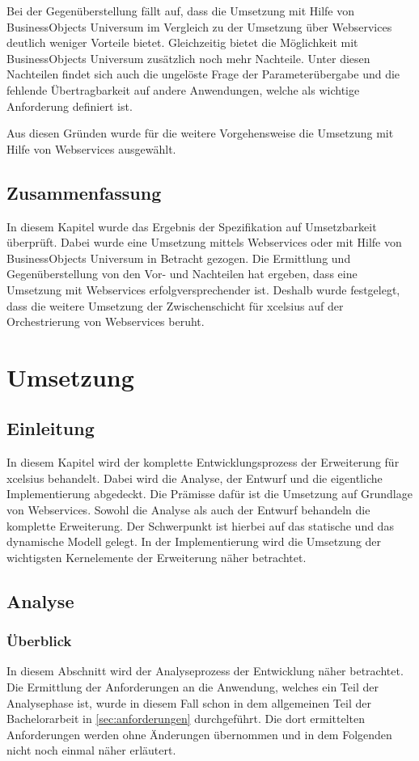 \begin{onehalfspacing}
Bei der Gegenüberstellung fällt auf, dass die Umsetzung mit Hilfe von BusinessObjects Universum im Vergleich zu der Umsetzung über Webservices deutlich weniger Vorteile bietet. Gleichzeitig bietet die Möglichkeit mit BusinessObjects Universum zusätzlich noch mehr Nachteile. Unter diesen Nachteilen findet sich auch die ungelöste Frage der Parameterübergabe und die fehlende Übertragbarkeit auf andere Anwendungen, welche als wichtige Anforderung definiert ist.

Aus diesen Gründen wurde für die weitere Vorgehensweise die Umsetzung mit Hilfe von Webservices ausgewählt.

\section{Zusammenfassung}
In diesem Kapitel wurde das Ergebnis der Spezifikation auf Umsetzbarkeit überprüft. Dabei wurde eine Umsetzung mittels Webservices oder mit Hilfe von BusinessObjects Universum in Betracht gezogen. Die Ermittlung und Gegenüberstellung von den Vor- und Nachteilen hat ergeben, dass eine Umsetzung mit Webservices erfolgversprechender ist. Deshalb wurde festgelegt, dass die weitere Umsetzung der Zwischenschicht für \gls{xcelsius} auf der Orchestrierung von Webservices beruht.

\chapter{Umsetzung}

\section{Einleitung}
In diesem Kapitel wird der komplette Entwicklungsprozess der Erweiterung für \gls{xcelsius} behandelt. Dabei wird die Analyse, der Entwurf und die eigentliche Implementierung abgedeckt. Die Prämisse dafür ist die Umsetzung auf Grundlage von Webservices. Sowohl die Analyse als auch der Entwurf behandeln die komplette Erweiterung. Der Schwerpunkt ist hierbei auf das statische und das dynamische Modell gelegt. In der Implementierung wird die Umsetzung der wichtigsten Kernelemente der Erweiterung näher betrachtet.

\section{Analyse}

\subsection{Überblick}
In diesem Abschnitt wird der Analyseprozess der Entwicklung näher betrachtet. Die Ermittlung der Anforderungen an die Anwendung, welches ein Teil der Analysephase ist, wurde in diesem Fall schon in dem allgemeinen Teil der Bachelorarbeit in \vref{sec:anforderungen} durchgeführt. Die dort ermittelten Anforderungen werden ohne Änderungen übernommen und in dem Folgenden nicht noch einmal näher erläutert.


\end{onehalfspacing}
